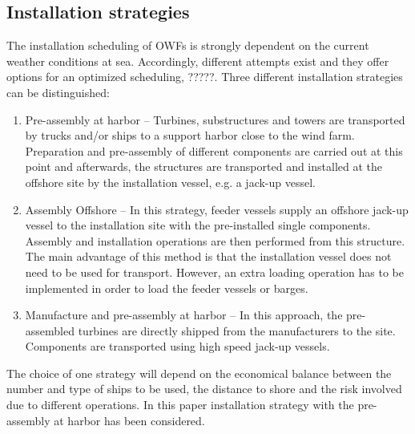 \subsection{Installation strategies}
The installation scheduling of OWFs is strongly dependent on the current weather conditions at sea. Accordingly, different attempts exist and they offer options for an optimized scheduling, ?????. Three different installation strategies can be distinguished:

\begin{enumerate}
\item Pre-assembly at harbor -- Turbines, substructures and towers are transported by trucks and/or ships to a support harbor close to the wind farm. Preparation and pre-assembly of different components are carried out at this point and afterwards, the structures are transported and installed at the offshore site by the installation vessel, e.g. a jack-up vessel.
\item Assembly Offshore -- In this strategy, feeder vessels supply an offshore jack-up vessel to the installation site with the pre-installed single components. Assembly and installation operations are then performed from this structure. The main advantage of this method is that the installation vessel does not need to be used for transport. However, an extra loading operation has to be implemented in order to load the feeder vessels or barges.
\item Manufacture and pre-assembly at harbor -- In this approach, the pre-assembled turbines are directly shipped from the manufacturers to the site. Components are transported using high speed jack-up vessels.
\end{enumerate}

The choice of one strategy will depend on the economical balance between the number and type of ships to be used, the distance to shore and the risk involved due to different operations. In this paper installation strategy with the pre-assembly at harbor has been considered.